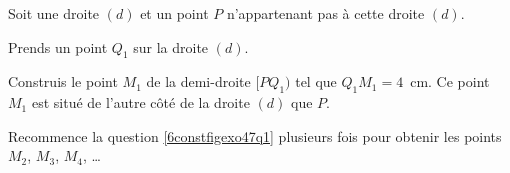 Soit une droite $(d)$ et un point $P$ n'appartenant pas à cette droite
$(d)$.
\begin{myenumerate}
  \item\label{6constfigexo47q1} Prends un point $Q_1$ sur la droite $(d)$.
  \item Construis le point $M_1$ de la demi-droite $[PQ_1)$ tel que
    $Q_1M_1=4$~cm. Ce point $M_1$ est situé de l'autre côté de la
    droite $(d)$ que $P$.
  \item Recommence la question \ref{6constfigexo47q1} plusieurs fois
    pour obtenir les points $M_2$, $M_3$, $M_4$, \ldots
\end{myenumerate}
